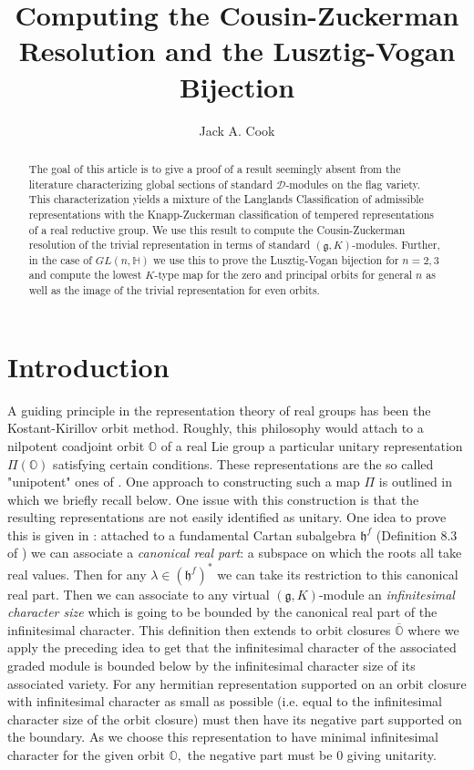 \documentclass[letterpaper,twosided,11pt]{article}
\title{Computing the Cousin-Zuckerman Resolution and the Lusztig-Vogan Bijection}
\author{Jack A. Cook}
\date{}
\theoremstyle{plain}
\theoremstyle{definition}
\theoremstyle{remark}
\newcommand{\HH}{\mathbb{H}}
\newcommand{\OO}{\mathbb{O}}
\newcommand{\close}[1]{\overline{#1}}
\newcommand{\lie}[1]{\mathfrak{#1}}
\begin{document}
\maketitle 



\begin{abstract} 
	The goal of this article is to give a proof of a result seemingly absent from the literature characterizing global sections of standard $\mathcal{D}$-modules on the flag variety. This characterization yields a mixture of the Langlands Classification of admissible representations with the Knapp-Zuckerman classification of tempered representations of a real reductive group. We use this result to compute the Cousin-Zuckerman resolution of the trivial representation in terms of standard $(\lie{g},K)$-modules. Further, in the case of $GL(n,\HH)$ we use this to prove the Lusztig-Vogan bijection for $n=2,3$ and compute the lowest $K$-type map for the zero and principal orbits for general $n$ as well as the image of the trivial representation for even orbits. 
\end{abstract} 


\tableofcontents


\section{Introduction}

A guiding principle in the representation theory of real groups has been the Kostant-Kirillov orbit method. Roughly, this philosophy would attach to a nilpotent coadjoint orbit $\OO$ of a real Lie group a particular unitary representation $\Pi(\OO)$ satisfying certain conditions. These representations are the so called "unipotent" ones of \cite{Vogan1991}. One approach to constructing such a map $\Pi$ is outlined in \cite{Vogan1998} which we briefly recall below. One issue with this construction is that the resulting representations are not easily identified as unitary. One idea to prove this is given in \cite[Section 8]{Vogan1998}: attached to a fundamental Cartan subalgebra $\lie{h}^f$ (Definition 8.3 of \cite{Vogan1998}) we can associate a \textit{canonical real part}: a subspace on which the roots all take real values. Then for any $\lambda\in (\lie{h}^f)^*$ we can take its restriction to this canonical real part. Then we can associate to any virtual $(\lie{g},K)$-module an \textit{infinitesimal character size} which is going to be bounded by the canonical real part of the infinitesimal character. This definition then extends to orbit closures $\close{\OO}$ where we apply the preceding idea to get that the infinitesimal character of the associated graded module is bounded below by the infinitesimal character size of its associated variety. For any hermitian representation supported on an orbit closure with infinitesimal character as small as possible (i.e. equal to the infinitesimal character size of the orbit closure) must then have its negative part supported on the boundary. As we choose this representation to have minimal infinitesimal character for the given orbit $\OO,$ the negative part must be $0$ giving unitarity.
\end{document}
